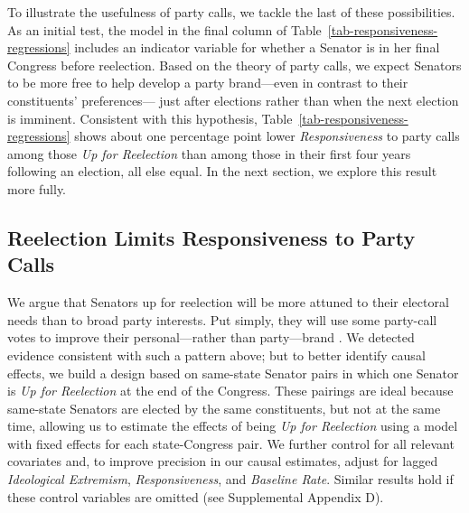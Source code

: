 \documentclass[12pt]{article}
\begin{document}
To illustrate the usefulness of party calls, we tackle the last of these possibilities. As an initial test, the model in the final column of Table~\ref{tab-responsiveness-regressions} includes an indicator variable for whether a Senator is in her final Congress before reelection.
Based on the theory of party calls,
we expect Senators to be more free to help develop a party brand---even
in contrast to their constituents' preferences---
just after elections
rather than when the next election is imminent.
Consistent with this hypothesis, Table~\ref{tab-responsiveness-regressions} shows about one percentage point lower \textit{Responsiveness} to party calls among those \textit{Up for Reelection} than among those in their first four years following an election, all else equal.  In the next section, we explore this result more fully.

\subsection*{Reelection Limits Responsiveness to Party Calls}

We argue that Senators up for reelection will be more attuned to their electoral needs than to broad party interests. Put simply, they will use some party-call votes to improve their personal---rather than party---brand
\citep[e.g.,][]{Canes-Wrone:2002, Carson:2010}.  We detected evidence consistent with such a pattern above; but to better identify causal effects, we build a design based on same-state Senator pairs in which one Senator is \textit{Up for Reelection} at the end of the Congress.  These pairings are ideal because same-state Senators are elected by the same constituents, but not at the same time, allowing us to estimate the effects of being \textit{Up for Reelection} using a model with fixed effects for each state-Congress pair.  We further control for all relevant covariates and, to improve precision in our causal estimates, adjust for lagged \textit{Ideological Extremism}, \textit{Responsiveness}, and \textit{Baseline Rate}. Similar results hold if these control variables are omitted (see Supplemental Appendix D).
\end{document}
